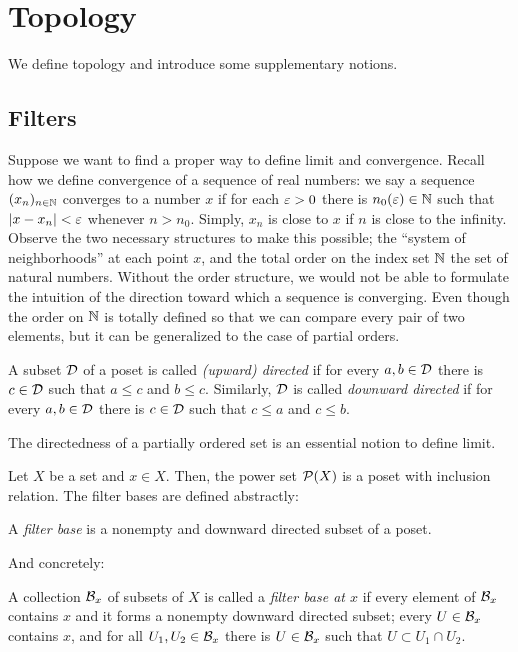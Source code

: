 \section{Topology}
We define topology and introduce some supplementary notions.




\subsection{Filters}
Suppose we want to find a proper way to define limit and convergence.
Recall how we define convergence of a sequence of real numbers: we say a sequence $(x_n)_{n\in\mathbb{N}}$ converges to a number $x$ if for each $\varepsilon>0$ there is $n_0(\varepsilon)\in\mathbb{N}$ such that $|x-x_n|<\varepsilon$ whenever $n>n_0$.
Simply, $x_n$ is close to $x$ if $n$ is close to the infinity.
Observe the two necessary structures to make this possible; the ``system of neighborhoods'' at each point $x$, and the total order on the index set $\mathbb{N}$ the set of natural numbers.
Without the order structure, we would not be able to formulate the intuition of the direction toward which a sequence is converging.
Even though the order on $\mathbb{N}$ is totally defined so that we can compare every pair of two elements, but it can be generalized to the case of partial orders.
\begin{defn}
A subset $\mathcal{D}$ of a poset is called \emph{(upward) directed} if for every $a,b\in\mathcal{D}$ there is $c\in\mathcal{D}$ such that $a\le c$ and $b\le c$.
Similarly, $\mathcal{D}$ is called \emph{downward directed} if for every $a,b\in\mathcal{D}$ there is $c\in\mathcal{D}$ such that $c\le a$ and $c\le b$.
\end{defn}

The directedness of a partially ordered set is an essential notion to define limit.

Let $X$ be a set and $x\in X$.
Then, the power set $\mathcal{P}(X)$ is a poset with inclusion relation.
The filter bases are defined abstractly:
\begin{defn}
A \emph{filter base} is a nonempty and downward directed subset of a poset.
\end{defn}
And concretely:
\begin{defn}
A collection $\mathcal{B}_x$ of subsets of $X$ is called a \emph{filter base at $x$} if every element of $\mathcal{B}_x$ contains $x$ and it forms a nonempty downward directed subset; every $U\in\mathcal{B}_x$ contains $x$, and for all $U_1,U_2\in\mathcal{B}_x$ there is $U\in\mathcal{B}_x$ such that $U\subset U_1\cap U_2$.
\end{defn}

